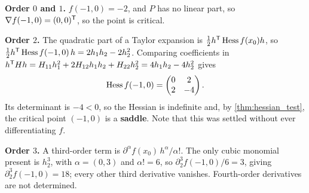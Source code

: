 \begin{exercisesolution}
\begin{enumerate}[label=\textbf{(\alph*)}]
    \textbf{Order $0$ and $1$.} $f(-1,0) = -2$, and $P$ has no linear part, so
    $\nabla f(-1,0) = (0,0)^{\mathsf{T}}$, so the point is critical.

    \textbf{Order $2$.} The quadratic part of a Taylor expansion is
    $\tfrac12 h^{\mathsf{T}}\operatorname{Hess} f(x_0)h$, so
    $\tfrac12h^{\mathsf{T}} \operatorname{Hess} f(-1,0)\,h = 2h_1h_2 - 2h_2^2$. Comparing coefficients in
    $h^{\mathsf{T}} Hh = H_{11}h_1^2 + 2H_{12}h_1h_2 + H_{22}h_2^2 = 4h_1h_2 - 4h_2^2$ gives
    \[\operatorname{Hess} f(-1,0) = \begin{pmatrix} 0 & 2 \\ 2 & -4\end{pmatrix}.\]
    Its determinant is $-4 < 0$, so the Hessian is indefinite and, by \cref{thm:hessian_test},
    the critical point $(-1,0)$ is a \textbf{saddle}. Note that this was settled without ever
    differentiating $f$.

    \textbf{Order $3$.} A third-order term is $\partial^\alpha f(x_0)\,h^\alpha/\alpha!$. The only
    cubic monomial present is $h_2^3$, with $\alpha = (0,3)$ and $\alpha! = 6$, so
    $\partial_2^3f(-1,0)/6 = 3$, giving $\partial_2^3f(-1,0) = 18$; every other third derivative
    vanishes. Fourth-order derivatives are not determined.
\end{enumerate}
\end{exercisesolution}

